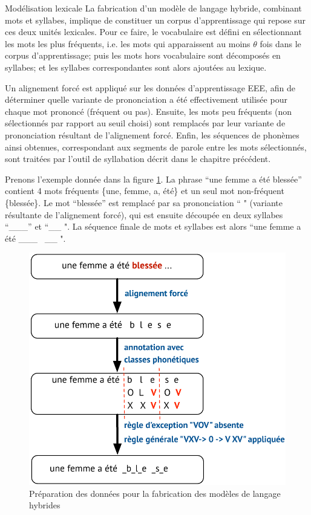\documentclass{style/these}
\begin{document}
\begin{part}{Modélisation lexicale}
La fabrication d'un modèle de langage hybride, combinant mots et syllabes, implique de constituer un corpus d'apprentissage qui repose sur ces deux unités lexicales. 
Pour ce faire, le vocabulaire est défini en sélectionnant les mots les plus fréquents, i.e. les mots qui apparaissent au moins $\theta$ fois dans le corpus d'apprentissage; puis les mots hors vocabulaire sont décomposés en syllabes; et les syllabes correspondantes sont alors ajoutées au lexique.

Un alignement forcé est appliqué sur les données d'apprentissage EEE, afin de déterminer quelle variante de prononciation a été effectivement utilisée pour chaque mot prononcé (fréquent ou pas). Ensuite, les mots peu fréquents (non sélectionnés par rapport au seuil choisi) sont remplacés par leur variante de prononciation résultant de l'alignement forcé. Enfin, les séquences de phonèmes ainsi obtenues, correspondant aux segments de parole entre les mots sélectionnés, sont traitées par l'outil de syllabation décrit dans le chapitre précédent.

Prenons l'exemple donnée dans la figure \ref{Fig:ExWS}. La phrase ``une femme a été blessée'' contient 4 mots fréquents \{une, femme, a, été\} et un seul mot non-fréquent \{blessée\}. Le mot ``blessée'' est remplacé par sa prononciation ``    " (variante résultante de l'alignement forcé), qui est ensuite découpée en deux syllabes ``\_\_\_'' et \linebreak ``\_\_ ". La séquence finale de mots et syllabes est alors ``une femme a été \_\_\_ \ \_\_ ".

\begin{figure}[h!]
\centering
\includegraphics[scale=0.65]{images/pictures/syllabation-WS.pdf}
\caption{Préparation des données pour la fabrication des modèles de langage hybrides}
\label{Fig:ExWS}
\end{figure}


\end{part}
\end{document}
